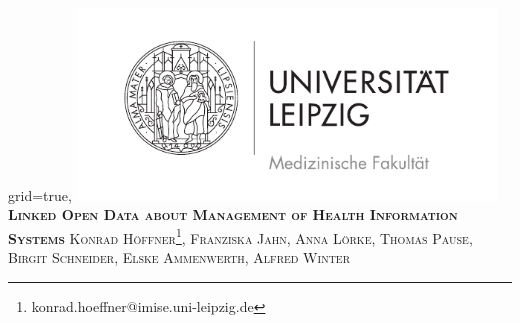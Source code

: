 \documentclass[portrait,final,a0paper,fontscale=0.310]{imiseposter}
\begin{document}


\begin{poster}%
  {grid=true,}
  {\includegraphics[width=30em]{img/medfak.pdf}} 
  {\bf\textsc{Linked Open Data about Management of Health Information Systems}\vspace{0.5em}
  }
  {\textsc{Konrad Höffner\footnote{konrad.hoeffner@imise.uni-leipzig.de}, Franziska Jahn, Anna Lörke, Thomas Pause, Birgit Schneider, Elske
  Ammenwerth, Alfred Winter}}
  {%
  }


    \newcommand{\colouredcircle}{%
      \tikz{\useasboundingbox (-0.2em,-0.32em) rectangle(0.2em,0.32em); \draw[draw=black,fill=imiseblue,line width=0.03em] (0,0) circle(0.18em);}}


\end{poster}
\end{document}
